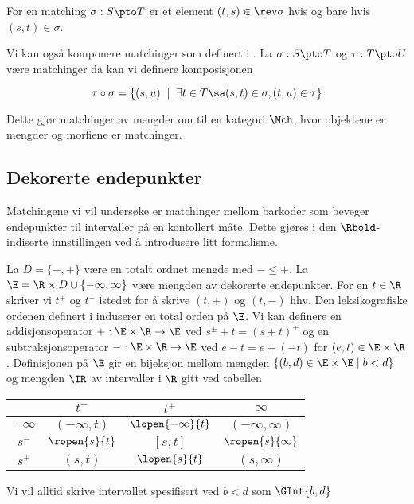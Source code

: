\begin{definition}\label{Def:rev}
	For en matching $\sigma: S\pto T$ er et element $(t,s)\in\rev\sigma$ hvis og bare hvis $(s,t)\in\sigma$.
\end{definition}

Vi kan også komponere matchinger som definert i \cite{Bauer2015a}. La $\sigma: S\pto T$ og $\tau: T\pto U$ være matchinger da kan vi definere komposisjonen

\[\tau\circ\sigma = \{(s,u)\;\mid\; \exists t\in T\sa (s,t)\in\sigma, (t,u)\in\tau\}\]

Dette gjør matchinger av mengder om til en kategori $\Mch$, hvor objektene er mengder og morfiene er matchinger.

\subsection{Dekorerte endepunkter}
Matchingene vi vil undersøke er matchinger mellom barkoder som beveger endepunkter til intervaller på en kontollert måte. Dette gjøres i den $\Rbold$-indiserte innstillingen ved å introdusere litt formalisme.

La $D = \{-,+\}$ være en totalt ordnet mengde med $-\leq+$. La $\E = \R\times
D\cup\{-\infty,\infty\}$ være mengden av dekorerte endepunkter. For en $t\in\R$
skriver vi $t^+$ og $t^-$ istedet for å skrive $(t,+)$ og $(t,-)$ hhv. Den
leksikografiske ordenen definert i  induserer en total orden på
$\E$. Vi kan definere en addisjonsoperator $+:\E\times\R\to\E$ ved $s^\pm+t=(s+t)^\pm$ og
en subtraksjonsoperator $-:\E\times\R\to\E$ ved $e-t=e+(-t)$ for $(e,t)\in\E\times\R$.
Definisjonen på $\E$ gir en bijeksjon mellom mengden $\{(b,d)\in\E\times\E\mid b<d\}$ og
mengden $\IR$ av intervaller i $\R$ gitt ved tabellen


\begin{table}[h]
  \centering
  \begin{tabular}{c|ccc}
      & $t^-$ & $t^+$ & $\infty$\\
    \hline
    $-\infty$ & $(-\infty,t)$ & $\lopen{-\infty}{t}$ & $(-\infty,\infty)$\\
    $s^-$ & $\ropen{s}{t}$ & $[s,t]$ & $\ropen{s}{\infty}$\\
    $s^+$ & $(s,t)$ & $\lopen{s}{t}$ & $(s,\infty)$
  \end{tabular}
   \label{tab:IntEndBij}
\end{table}

Vi vil alltid skrive intervallet spesifisert ved $b<d$ som
$\GInt{b,d}$
